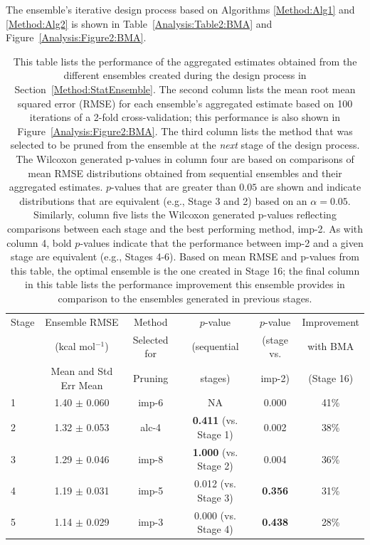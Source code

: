\documentclass[journal=jpcbfk, manuscript=article]{achemso}
\newcommand{\+}[1]{\ensuremath{\mathbf{#1}}}
\newcommand{\rev}[1]{#1}
\begin{document}
The ensemble's iterative design process based on Algorithms \ref{Method:Alg1} and \ref{Method:Alg2} is shown in Table~\ref{Analysis:Table2:BMA} and Figure~\ref{Analysis:Figure2:BMA}.
\begin{table}[t!]
	\centering
	\caption[Table 2]{This table lists the performance of the aggregated estimates obtained from the different ensembles created during the design process in Section~\ref{Method:StatEnsemble}.
	The second column lists the mean root mean squared error (RMSE) for each ensemble's aggregated estimate based on 100 iterations of a 2-fold cross-validation; this performance is also shown in Figure~\ref{Analysis:Figure2:BMA}.
	The third column lists the method that was selected to be pruned from the ensemble at the \emph{next} stage of the design process.
	The Wilcoxon generated p-values in column four are based on comparisons of mean RMSE distributions obtained from sequential ensembles and their aggregated estimates.
	$p$-values that are greater than $0.05$ are shown and indicate distributions that are equivalent (e.g., Stage 3 and 2) based on an $\alpha = 0.05$.
	Similarly, column five lists the Wilcoxon generated p-values reflecting comparisons between each stage and the best performing method, imp-2.
	As with column 4, bold $p$-values indicate that the performance between imp-2 and a given stage are equivalent (e.g., Stages 4-6).
	Based on mean RMSE and p-values from this table, the optimal ensemble is the one created in Stage 16; the final column in this table lists the performance improvement this ensemble provides in comparison to the ensembles generated in previous stages.}
	\scriptsize
	\rev{
	\begin{tabular}{l|c|c|c|c|c}
		\hline
		\hline
		Stage	& Ensemble RMSE		& Method 			& $p$-value		& $p$-value		& Improvement \\
				& (kcal mol$^{-1}$)	& Selected for		& (sequential 	& (stage vs.	& with BMA \\
				& Mean and Std Err Mean	& Pruning			& stages)		& imp-2)		& (Stage 16) \\
		\hline
		 1 & 1.40 $\pm$ 0.060 & imp-6 & NA & 0.000 & 41\%\\
		 2  & 1.32 $\pm$ 0.053 & alc-4&  \textbf{0.411} (vs. Stage 1) & 0.002 & 38\%\\
		 3 & 1.29 $\pm$ 0.046 & imp-8 & \textbf{1.000}  (vs. Stage 2) & 0.004 & 36\%\\
		 4 & 1.19 $\pm$ 0.031 & imp-5 & 0.012  (vs. Stage 3) & \textbf{0.356} & 31\%\\
		 5 & 1.14 $\pm$ 0.029 & imp-3 & 0.000  (vs. Stage 4) & \textbf{0.438} & 28\%\\

\end{tabular}}
\end{table}
\end{document}
